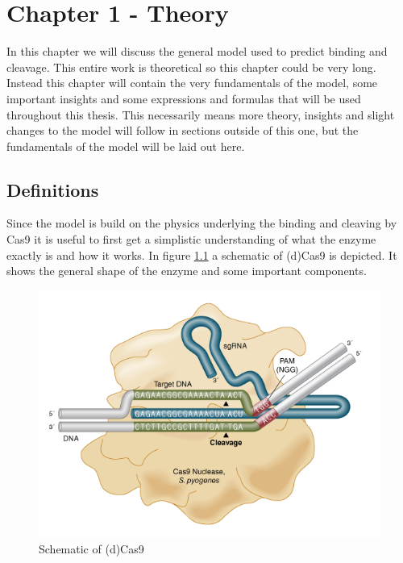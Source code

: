 \chapter{Chapter 1 - Theory}

In this chapter we will discuss the general model used to predict binding and cleavage. This entire work is theoretical so this chapter could be very long. Instead this chapter will contain the very fundamentals of the model, some important insights and some expressions and formulas that will be used throughout this thesis. This necessarily means more theory, insights and slight changes to the model will follow in sections outside of this one, but the fundamentals of the model will be laid out here.


\section{Definitions}
Since the model is build on the physics underlying the binding and cleaving by Cas9 it is useful to first get a simplistic understanding of what the enzyme exactly is and how it works. In figure \ref{fig:Cas9schematic} a schematic of (d)Cas9 is depicted. It shows the general shape of the enzyme and some important components.


\begin{figure}[H]
\begin{center}
\includegraphics[width=\textwidth]{images/Cas9schematic}
\caption{Schematic of (d)Cas9}
\label{fig:Cas9schematic}
\end{center}
\end{figure}

